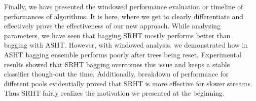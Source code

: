 Finally, we have presented the windowed performance evaluation or timeline of performances of algorithms. It is here, where we get to clearly differentiate and effectively prove the effectiveness of our new approach. While analyzing parameters, we have seen that bagging SRHT mostly performs better than bagging with ASHT. However, with windowed analysis, we demonstrated how in ASHT bagging ensemble performs poorly after trees being reset. Experimental results showed that SRHT bagging overcomes this issue and keeps a stable classifier though-out the time. Additionally, breakdown of performance for different pools evidentially proved that SRHT is more effective for slower streams. Thus SRHT fairly realizes the motivation we presented at the beginning.
